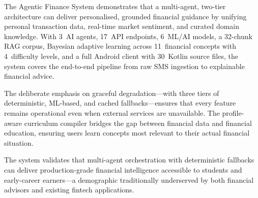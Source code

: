 \documentclass[conference]{IEEEtran}
\begin{document}
The Agentic Finance System demonstrates that a multi-agent, two-tier architecture can deliver personalised, grounded financial guidance by unifying personal transaction data, real-time market sentiment, and curated domain knowledge. With 3~AI agents, 17~API endpoints, 6~ML/AI models, a 32-chunk RAG corpus, Bayesian adaptive learning across 11~financial concepts with 4~difficulty levels, and a full Android client with 30~Kotlin source files, the system covers the end-to-end pipeline from raw SMS ingestion to explainable financial advice.

The deliberate emphasis on graceful degradation---with three tiers of deterministic, ML-based, and cached fallbacks---ensures that every feature remains operational even when external services are unavailable. The profile-aware curriculum compiler bridges the gap between financial data and financial education, ensuring users learn concepts most relevant to their actual financial situation.

The system validates that multi-agent orchestration with deterministic fallbacks can deliver production-grade financial intelligence accessible to students and early-career earners---a demographic traditionally underserved by both financial advisors and existing fintech applications.
\end{document}
